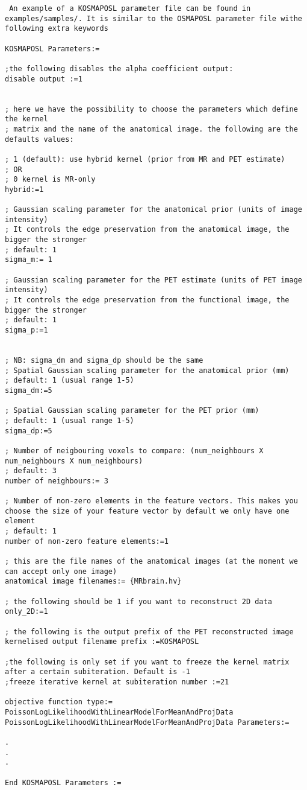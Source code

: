 \documentclass{article}
\begin{document}
 \begin{verbatim}
 An example of a KOSMAPOSL parameter file can be found in examples/samples/. It is similar to the OSMAPOSL parameter file withe following extra keywords

KOSMAPOSL Parameters:=

;the following disables the alpha coefficient output:
disable output :=1


; here we have the possibility to choose the parameters which define the kernel
; matrix and the name of the anatomical image. the following are the defaults values:

; 1 (default): use hybrid kernel (prior from MR and PET estimate)
; OR
; 0 kernel is MR-only
hybrid:=1

; Gaussian scaling parameter for the anatomical prior (units of image intensity)
; It controls the edge preservation from the anatomical image, the bigger the stronger
; default: 1
sigma_m:= 1

; Gaussian scaling parameter for the PET estimate (units of PET image intensity)
; It controls the edge preservation from the functional image, the bigger the stronger
; default: 1
sigma_p:=1


; NB: sigma_dm and sigma_dp should be the same
; Spatial Gaussian scaling parameter for the anatomical prior (mm)
; default: 1 (usual range 1-5)
sigma_dm:=5

; Spatial Gaussian scaling parameter for the PET prior (mm)
; default: 1 (usual range 1-5)
sigma_dp:=5

; Number of neigbouring voxels to compare: (num_neighbours X num_neighbours X num_neighbours)
; default: 3
number of neighbours:= 3

; Number of non-zero elements in the feature vectors. This makes you choose the size of your feature vector by default we only have one element
; default: 1
number of non-zero feature elements:=1

; this are the file names of the anatomical images (at the moment we can accept only one image)
anatomical image filenames:= {MRbrain.hv}

; the following should be 1 if you want to reconstruct 2D data
only_2D:=1

; the following is the output prefix of the PET reconstructed image
kernelised output filename prefix :=KOSMAPOSL

;the following is only set if you want to freeze the kernel matrix after a certain subiteration. Default is -1
;freeze iterative kernel at subiteration number :=21

objective function type:= PoissonLogLikelihoodWithLinearModelForMeanAndProjData
PoissonLogLikelihoodWithLinearModelForMeanAndProjData Parameters:=

.
.
.

End KOSMAPOSL Parameters :=
  \end{verbatim}
\end{document}
